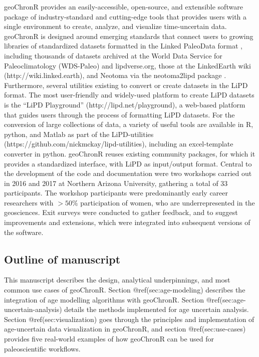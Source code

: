 \documentclass[gchron, manuscript]{copernicus}
\begin{document}
geoChronR provides an easily-accessible, open-source, and extensible
software package of industry-standard and cutting-edge tools that
provides users with a single environment to create, analyze, and
visualize time-uncertain data. geoChronR is designed around emerging
standards that connect users to growing libraries of standardized
datasets formatted in the Linked PaleoData format \citep{lipd_cp},
including thousands of datasets archived at the World Data Service for
Paleoclimatology (WDS-Paleo) and lipdverse.org, those at the LinkedEarth
wiki (http://wiki.linked.earth), and Neotoma \citep{williams2018neotoma}
via the neotoma2lipd package \citep{neotoma2lipd}. Furthermore, several
utilities existing to convert or create datasets in the LiPD format. The
most user-friendly and widely-used platform to create LiPD datasets is
the ``LiPD Playground'' (http://lipd.net/playground), a web-based
platform that guides users through the process of formatting LiPD
datasets. For the conversion of large collections of data, a variety of
useful tools are available in R, python, and Matlab as part of the
LiPD-utilities (https://github.com/nickmckay/lipd-utilities), including
an excel-template converter in python. geoChronR reuses existing
community packages, for which it provides a standardized interface, with
LiPD as input/output format. Central to the development of the code and
documentation were two workshops carried out in 2016 and 2017 at
Northern Arizona University, gathering a total of 33 participants. The
workshop participants were predominantly early career researchers with
\(>50\%\) participation of women, who are underrepresented in the
geosciences. Exit surveys were conducted to gather feedback, and to
suggest improvements and extensions, which were integrated into
subsequent versions of the software.

\subsection{Outline of manuscript}

This manuscript describes the design, analytical underpinnings, and most
common use cases of geoChronR. Section @ref(sec:age-modeling) describes
the integration of age modelling algorithms with geoChronR. Section
@ref(sec:age-uncertain-analysis) details the methods implemented for age
uncertain analysis. Section @ref(sec:visualization) goes through the
principles and implementation of age-uncertain data visualization in
geoChronR, and section @ref(sec:use-cases) provides five real-world
examples of how geoChronR can be used for paleoscientific workflows.
\end{document}
